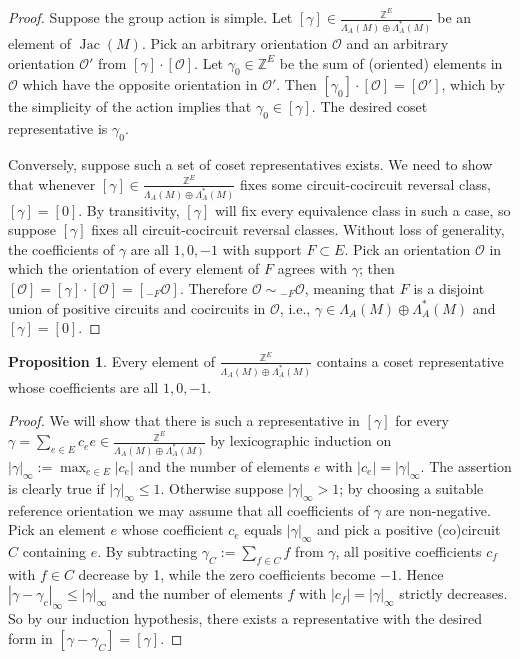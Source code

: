 \documentclass[12pt]{amsart}
\numberwithin{equation}{section}
\theoremstyle{definition}
\newtheorem{proposition}[theorem]{Proposition}
\newcommand{\Jac}{\operatorname{Jac}}
\begin{document}
\begin{proof}
Suppose the group action is simple. Let $[\gamma]\in\frac{\mathbb{Z}^E}{\Lambda_A(M)\oplus \Lambda_A^*(M)}$ be an element of $\Jac(M)$. Pick an arbitrary orientation $\mathcal{O}$ and an arbitrary orientation $\mathcal{O}'$ from $[\gamma]\cdot[\mathcal{O}]$. Let $\gamma_0\in \mathbb{Z}^E$ be the sum of (oriented) elements in $\mathcal{O}$ which have the opposite orientation in $\mathcal{O}'$. Then $[\gamma_0]\cdot[\mathcal{O}]=[\mathcal{O}']$, which by the simplicity of the action implies that $\gamma_0\in[\gamma]$.  The desired coset representative is $\gamma_0$.

Conversely, suppose such a set of coset representatives exists. We need to show that whenever $[\gamma]\in\frac{\mathbb{Z}^E}{\Lambda_A(M)\oplus \Lambda_A^*(M)}$ fixes some circuit-cocircuit reversal class, $[\gamma]=[0]$. By transitivity, $[\gamma]$ will fix every equivalence class in such a case, so suppose $[\gamma]$ fixes all circuit-cocircuit reversal classes. Without loss of generality, the coefficients of $\gamma$ are all $1,0,-1$ with support $F\subset E$. Pick an orientation $\mathcal{O}$ in which the orientation of every element of $F$ agrees with $\gamma$; then $[\mathcal{O}]=[\gamma]\cdot[\mathcal{O}]=[_{-F}\mathcal{O}]$. Therefore $\mathcal{O}\sim\!_{-F}\mathcal{O}$, meaning that $F$ is a disjoint union of positive circuits and cocircuits in $\mathcal{O}$, i.e., $\gamma\in \Lambda_A(M)\oplus \Lambda_A^*(M)$ and $[\gamma]=[0]$.
\end{proof}

\begin{proposition} \label{Prop:JacRep}
Every element of $\frac{\mathbb{Z}^E}{\Lambda_A(M)\oplus \Lambda_A^*(M)}$ contains a coset representative whose coefficients are all $1,0,-1$.
\end{proposition}

\begin{proof}
We will show that there is such a representative in $[\gamma]$ for every $\gamma=\sum_{e\in E} c_ee\in\frac{\mathbb{Z}^E}{\Lambda_A(M)\oplus \Lambda_A^*(M)}$ by lexicographic induction on $|\gamma|_\infty:=\max_{e\in E}|c_e|$ and the number of elements $e$ with $|c_e|=|\gamma|_\infty$. The assertion is clearly true if $|\gamma|_\infty\leq 1$. Otherwise suppose $|\gamma|_\infty>1$; by choosing a suitable reference orientation we may assume that all coefficients of $\gamma$ are non-negative. Pick an element $e$ whose coefficient $c_e$ equals $|\gamma|_\infty$ and pick a positive (co)circuit $C$ containing $e$. By subtracting $\gamma_C:=\sum_{f\in C} f$ from $\gamma$, all positive coefficients $c_f$ with $f\in C$ decrease by 1, while the zero coefficients become $-1$. Hence $|\gamma-\gamma_c|_\infty\leq|\gamma|_\infty$ and the number of elements $f$ with $|c_f|=|\gamma|_\infty$ strictly decreases. So by our induction hypothesis, there exists a representative with the desired form in $[\gamma-\gamma_C]=[\gamma]$.
\end{proof}
\end{document}
